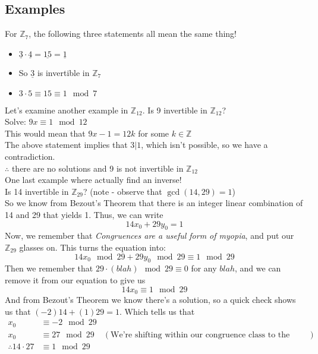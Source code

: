 \documentclass[10pt]{article}
\newcommand{\Z}{\mathbb{Z}}
\theoremstyle{definition}
\theoremstyle{remark}
\def\Z{\mathbb{ Z}}
\begin{document}
\subsection{Examples}
For $\Z_7$, the following three statements all mean the same thing!
\begin{itemize}
\item $\underline{3} \cdot \underline{4} = \underline{15} = \underline{1}$
\item So $\underline{3}$ is invertible in $\Z_7$
\item $3 \cdot 5 \equiv 15 \equiv 1 \mod 7$
\end{itemize}
Let's examine another example in $\Z_{12}$.  Is 9 invertible in $\Z_{12}$?\\
Solve: $9x \equiv 1 \mod 12$\\
This would mean that $9x-1 = 12k$ for some $k \in \Z$\\
The above statement implies that $3|1$, which isn't possible, so we have a contradiction.\\
$\therefore$ there are no solutions and 9 is not invertible in $\Z_{12}$\\
\newline
One last example where actually find an inverse!\\
Is 14 invertible in $\Z_{29}$?  (note - observe that $\gcd(14,29) = 1$)\\
So we know from Bezout's Theorem that there is an integer linear combination of 14 and 29 that yields 1.  Thus, we can write $$14x_0 + 29y_0 = 1$$
Now, we remember that \textit{Congruences are a useful form of myopia}, and put our $\Z_{29}$ glasses on.  This turns the equation into:
$$14x_0\mod 29 + 29y_0 \mod 29 \equiv 1 \mod 29$$
Then we remember that $29 \cdot (blah) \mod 29 \equiv 0$ for any $blah$, and we can remove it from our equation to give us
$$14x_0 \equiv 1 \mod 29$$
And from Bezout's Theorem we know there's a solution, so a quick check shows us that $(-2)14 + (1)29 = 1$.  Which tells us that 
\begin{align*}
x_0 &\equiv -2 \mod 29\\
x_0 &\equiv 27 \mod 29 &(\text{We're shifting within our congruence class to the least positive member of the class})\\
\therefore 14\cdot 27 &\equiv 1 \mod 29 
\end{align*}
\end{document}
